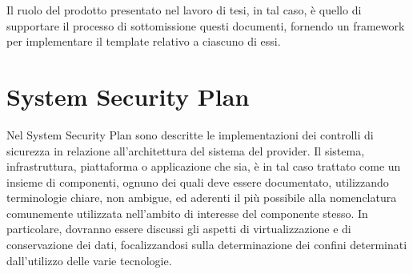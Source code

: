 \documentclass[../main.tex]{subfiles}
\begin{document}
Il ruolo del prodotto presentato nel lavoro di tesi, in tal caso, è quello di supportare il processo di sottomissione questi documenti, fornendo un framework per implementare il template relativo a ciascuno di essi.

\section{System Security Plan}

Nel System Security Plan sono descritte le implementazioni dei controlli di sicurezza in relazione all'architettura del sistema del provider.
Il sistema, infrastruttura, piattaforma o applicazione che sia, è in tal caso trattato come un insieme di componenti, ognuno dei quali deve essere documentato,  utilizzando terminologie chiare, non ambigue, ed aderenti il più possibile alla nomenclatura comunemente utilizzata nell'ambito di interesse del componente stesso.
In particolare, dovranno essere discussi gli aspetti di virtualizzazione e di conservazione dei dati, focalizzandosi sulla determinazione dei confini determinati dall'utilizzo delle varie tecnologie.
\end{document}
